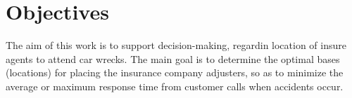 \section{Objectives}
The aim of this work is to support decision-making,
regardin location of insure agents to attend car wrecks.
The main goal is
to determine the optimal bases (locations)
for placing the insurance company adjusters,
so as to minimize
the average or maximum response time
from customer calls
when accidents occur.
